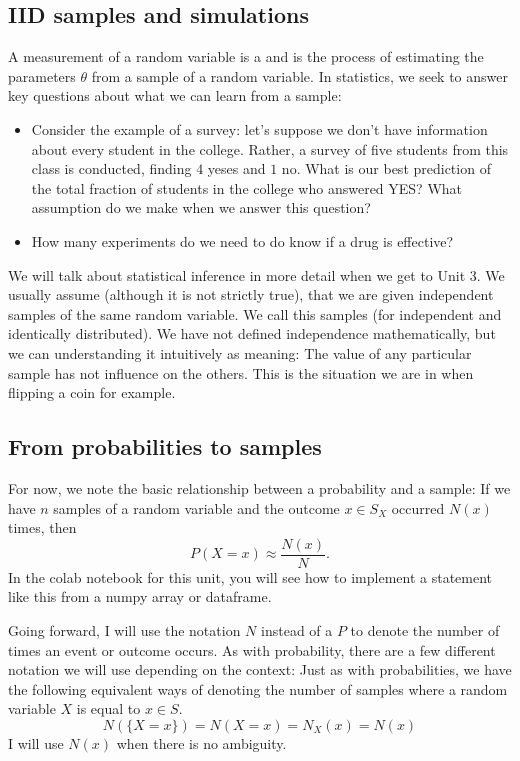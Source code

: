 \subsection{IID samples and simulations}
A measurement of a random variable is a  and   is the process of estimating the parameters $\theta$ from a sample of a random variable. In statistics, we seek to answer key questions about what we can learn from a sample:
\begin{itemize}
\item Consider the example of a survey: let's suppose we don't have information about every student in the college. Rather, a survey of five students from this class is conducted, finding $4$ yeses and $1$ no. What is our best prediction of the total fraction of students in the college who answered YES? What assumption do we make when we answer this question? 
\item How many experiments do we need to do know if a drug is effective? 
\end{itemize}
We will talk about statistical inference in more detail when we get to Unit 3. 
We usually assume (although it is not strictly true), that we are given independent samples of the same random variable. We call this  samples (for independent and identically distributed).  We have not defined independence mathematically, but we can understanding it intuitively as meaning: The value of any particular sample has not influence on the others. This is the situation we are in when flipping a coin for example. 


\subsection{From probabilities to samples}
For now, we note the basic relationship between a probability and a sample: If we have $n$ samples of a random variable and the outcome $x \in S_X$ occurred $N(x)$ times, then 
\begin{equation}
P(X=x) \approx \frac{N(x)}{N}.
\end{equation}
In the colab notebook for this unit, you will see how to implement a statement like this from a numpy array or dataframe.  


Going forward, I will use the notation $N$ instead of a $P$ to denote the number of times an event or outcome occurs. As with probability, there are a few different notation we will use depending on the context: Just as with probabilities, we have the following equivalent ways of denoting the number of samples where a random variable $X$ is equal to $x \in S$. 
\begin{equation}
N(\{X= x\}) =N(X=x) = N_X(x) = N(x) 
\end{equation}
I will use $N(x)$ when there is no ambiguity.  



